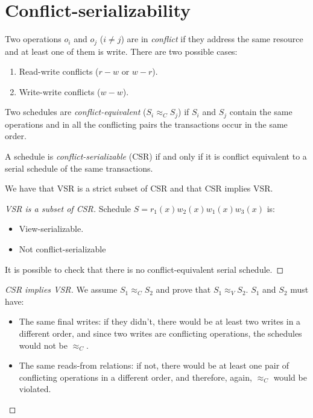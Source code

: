 \documentclass[12pt, a4paper]{report}
\begin{document}
    \section{Conflict-serializability}
    \begin{definition}
        Two operations $o_i$ and $o_j$ ($i \neq j$) are in \emph{conflict} if they address the same resource and at least one of them is write. There are two possible cases:
        \begin{enumerate}
            \item Read-write conflicts ($r-w$ or $w-r$).
            \item Write-write conflicts ($w-w$).
        \end{enumerate}

        Two schedules are \emph{conflict-equivalent} ($S_i \approx_C S_j$) if $S_i$ and $S_j$ contain the same operations and in all the conflicting pairs the transactions occur 
        in the same order. 

        A schedule is \emph{conflict-serializable} (CSR) if and only if it is conflict equivalent to a serial schedule of the same transactions. 
    \end{definition}
    We have that VSR is a strict subset of CSR and that CSR implies VSR. 
    \begin{proof}[VSR is a subset of CSR]
        Schedule $S = r_1(x) w_2(x) w_1(x) w_3(x)$ is: 
        \begin{itemize}
            \item View-serializable.
            \item Not conflict-serializable
        \end{itemize}
        It is possible to check that there is no conflict-equivalent serial schedule.
    \end{proof}
    \begin{proof}[CSR implies VSR]
        We assume $S_1 \approx_C S_2$ and prove that $S_1 \approx_V S_2$. $S_1$ and $S_2$ must have: 
        \begin{itemize}
            \item The same final writes: if they didn't, there would be at least two writes in a different order, and since two
                writes are conflicting operations, the schedules would not be $\approx_C$. 
            \item The same reads-from relations: if not, there would be at least one pair of conflicting operations in a different
                order, and therefore, again, $\approx_C$ would be violated. 
        \end{itemize}
    \end{proof}
\end{document}
